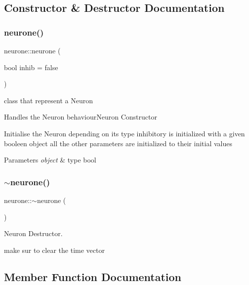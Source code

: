 \subsection{Constructor \& Destructor Documentation}
\mbox{\label{classneurone_a45317bb4df99f1e79b5dd3d5ca7fe641}} 
\subsubsection{\texorpdfstring{neurone()}{neurone()}}
{\footnotesize\ttfamily neurone\+::neurone (\begin{DoxyParamCaption}\item[{bool}]{inhib = {\ttfamily false} }\end{DoxyParamCaption})}



class that represent a Neuron 

Handles the Neuron behaviour\+Neuron Constructor

Initialise the Neuron depending on it\textquotesingle{}s type inhibitory is initialized with a given booleen object all the other parameters are initialized to their initial values


\begin{DoxyParams}{Parameters}
{\em object} & type bool \\
\hline
\end{DoxyParams}
\mbox{\label{classneurone_a88029788e99ac38981e04959a777a227}} 
\subsubsection{\texorpdfstring{$\sim$neurone()}{~neurone()}}
{\footnotesize\ttfamily neurone\+::$\sim$neurone (\begin{DoxyParamCaption}{ }\end{DoxyParamCaption})}



Neuron Destructor. 

make sur to clear the time vector 

\subsection{Member Function Documentation}
\mbox{\label{classneurone_a8c25852b6c75970227a57b51665dd5b8}} 
